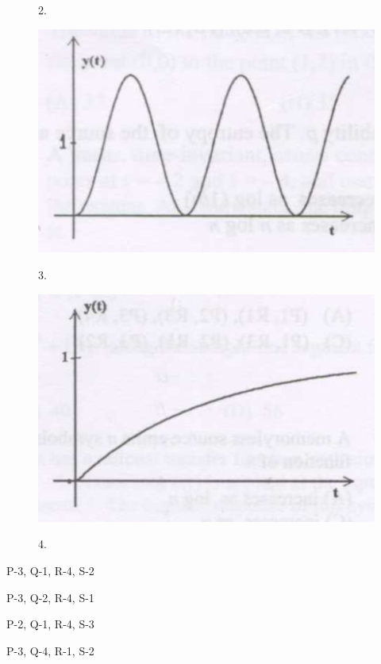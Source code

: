 \documentclass[a4paper, 11pt]{article}
\begin{document}
\begin{enumerate}
\begin{figure}[H]
\begin{minipage}{0.45\textwidth}
            \centerline{2.}
        \end{minipage}
        \vfill
        \begin{minipage}{0.45\textwidth}
            \centering
            \includegraphics[width=0.9\columnwidth]{figs/q38C.png}
            \centerline{3.}
        \end{minipage}
        \hfill
        \begin{minipage}{0.45\textwidth}
            \centering
            \includegraphics[width=0.9\columnwidth]{figs/q38D.png}
            \centerline{4.}
        \end{minipage}
        \caption*{}
        \label{fig:q38_options}
    \end{figure}
    
    \begin{enumerate}
        \begin{multicols}{2}
            \item P-3, Q-1, R-4, S-2
            \item P-3, Q-2, R-4, S-1
            \item P-2, Q-1, R-4, S-3
            \item P-3, Q-4, R-1, S-2
        \end{multicols}
    \end{enumerate}


\end{enumerate}
\end{document}
